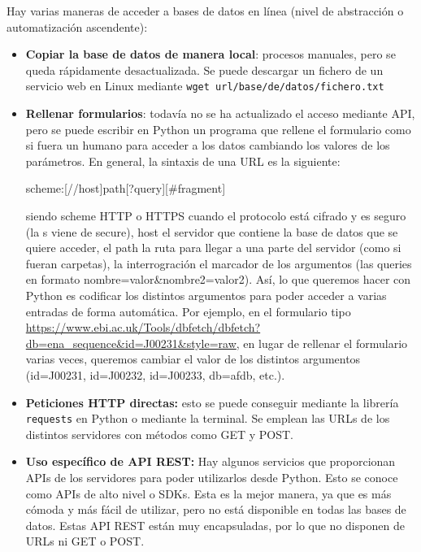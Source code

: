 Hay varias maneras de acceder a bases de datos en línea (nivel de abstracción o automatización ascendente):
\begin{itemize}
\item \textbf{Copiar la base de datos de manera local}: procesos manuales, pero se queda rápidamente desactualizada. Se puede descargar un fichero de un servicio web en Linux mediante \texttt{wget url/base/de/datos/fichero.txt}
\item \textbf{Rellenar formularios}: todavía no se ha actualizado el acceso mediante API, pero se puede escribir en Python un programa que rellene el formulario como si fuera un humano para acceder a los datos cambiando los valores de los parámetros. En general, la sintaxis de una URL es la siguiente:
\begin{center}
scheme:[//host]path[?query][\#fragment]\\
\end{center}
siendo scheme HTTP o HTTPS cuando el protocolo está cifrado y es seguro (la s viene de secure), host el servidor que contiene la base de datos que se quiere acceder, el path la ruta para llegar a una parte del servidor (como si fueran carpetas), la interrogración el marcador de los argumentos (las queries en formato nombre=valor\&nombre2=valor2). Así, lo que queremos hacer con Python es codificar los distintos argumentos para poder acceder a varias entradas de forma automática. Por ejemplo, en el formulario tipo \href{https://www.ebi.ac.uk/Tools/dbfetch/dbfetch?db=ena\_sequence\&id=J00231\&style=raw}{https://www.ebi.ac.uk/Tools/dbfetch/dbfetch?db=ena\_sequence\&id=J00231\&style=raw}, en lugar de rellenar el formulario varias veces, queremos cambiar el valor de los distintos argumentos (id=J00231, id=J00232, id=J00233, db=afdb, etc.). 
\item \textbf{Peticiones HTTP directas:} esto se puede conseguir mediante la librería \texttt{requests} en Python o mediante la terminal. Se emplean las URLs de los distintos servidores con métodos como GET y POST.
\item \textbf{Uso específico de API REST:} Hay algunos servicios que proporcionan APIs de los servidores para poder utilizarlos desde Python. Esto se conoce como APIs de alto nivel o SDKs. Esta es la mejor manera, ya que es más cómoda y más fácil de utilizar, pero no está disponible en todas las bases de datos. Estas API REST están muy encapsuladas, por lo que no disponen de URLs ni GET o POST.
\end{itemize} 

